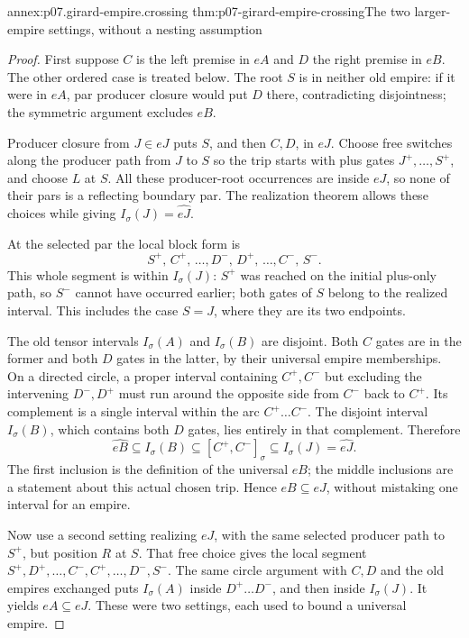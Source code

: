 \begin{annexitem}{annex:p07.girard-empire.crossing}
 {thm:p07-girard-empire-crossing}{The two larger-empire settings, without a nesting assumption}
\begin{proof}
First suppose \(C\) is the left premise in \(eA\) and \(D\) the
right premise in \(eB\). The other ordered case is treated below.
The root \(S\) is in neither old empire: if it were in \(eA\),
par producer closure would put \(D\) there, contradicting disjointness;
the symmetric argument excludes \(eB\).

Producer closure from \(J\in eJ\) puts \(S\), and then \(C,D\),
in \(eJ\). Choose free switches along the producer path from \(J\)
to \(S\) so the trip starts with plus gates
\(J^+,\ldots,S^+\), and choose \(L\) at \(S\).
All these producer-root occurrences are inside \(eJ\), so none of
their pars is a reflecting boundary par.
The realization theorem allows these choices while giving
\(I_\sigma(J)=\widehat{eJ}\).

At the selected par the local block form is
\[
 S^+,\,C^+,\,\ldots,D^-,\,D^+,\,\ldots,C^-,\,S^-.
\]
This whole segment is within \(I_\sigma(J)\): \(S^+\) was reached
on the initial plus-only path, so \(S^-\) cannot have occurred earlier;
both gates of \(S\) belong to the realized interval.
This includes the case \(S=J\), where they are its two endpoints.

The old tensor intervals \(I_\sigma(A)\) and \(I_\sigma(B)\) are
disjoint. Both \(C\) gates are in the former and both \(D\) gates
in the latter, by their universal empire memberships.
On a directed circle, a proper interval containing \(C^+,C^-\)
but excluding the intervening \(D^-,D^+\) must run around the
opposite side from \(C^-\) back to \(C^+\).
Its complement is a single interval within the arc \(C^+\ldots C^-\).
The disjoint interval \(I_\sigma(B)\), which contains both \(D\) gates,
lies entirely in that complement. Therefore
\[
 \widehat{eB}\subseteq I_\sigma(B)
       \subseteq [C^+,C^-]_\sigma
       \subseteq I_\sigma(J)=\widehat{eJ}.
\]
The first inclusion is the definition of the universal \(eB\);
the middle inclusions are a statement about this actual chosen trip.
Hence \(eB\subseteq eJ\), without mistaking one interval for an empire.

Now use a second setting realizing \(eJ\), with the same selected
producer path to \(S^+\), but position \(R\) at \(S\).
That free choice gives the local segment
\(S^+,D^+,\ldots,C^-,C^+,\ldots,D^-,S^-\).
The same circle argument with \(C,D\) and the old empires exchanged
puts \(I_\sigma(A)\) inside \(D^+\ldots D^-\), and then inside
\(I_\sigma(J)\). It yields \(eA\subseteq eJ\).
These were two settings, each used to bound a universal empire.


\end{proof}
\end{annexitem}
